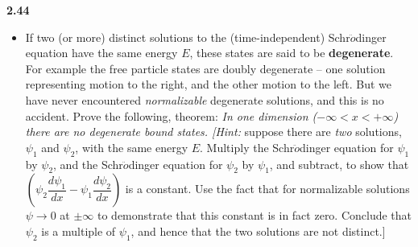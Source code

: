 \documentclass[fleqn]{article}
\begin{document}
  \textbf{2.44}
  \begin{itemize}
    \item If two (or more) distinct solutions to the (time-independent) Schr$\ddot{o}$dinger equation have the
    same energy $E$, these states are said to be \textbf{degenerate}. For example the free particle states are 
    doubly degenerate -- one solution representing motion to the right, and the other motion to the left. But
    we have never encountered \emph{normalizable} degenerate solutions, and this is no accident. Prove the following,
    theorem: \emph{In one dimension ($-\infty < x < +\infty$) there are no degenerate bound states. [Hint:} suppose
    there are \emph{two} solutions, $\psi_1$ and $\psi_2$, with the same energy $E$. Multiply the Schr$\ddot{o}$dinger equation
    for $\psi_1$ by $\psi_2$, and the Schr$\ddot{o}$dinger equation for $\psi_2$ by $\psi_1$, and subtract,
    to show that $\left(\psi_2 \dfrac{d\psi_1}{dx}-\psi_1 \dfrac{d\psi_2}{dx}\right)$ is a constant. Use the 
    fact that for normalizable solutions $\psi \longrightarrow 0$ at $\pm \infty$ to demonstrate that this constant
    is in fact zero. Conclude that $\psi_2$ is a multiple of $\psi_1$, and hence that the two solutions
    are not distinct.]


\end{itemize}
\end{document}
